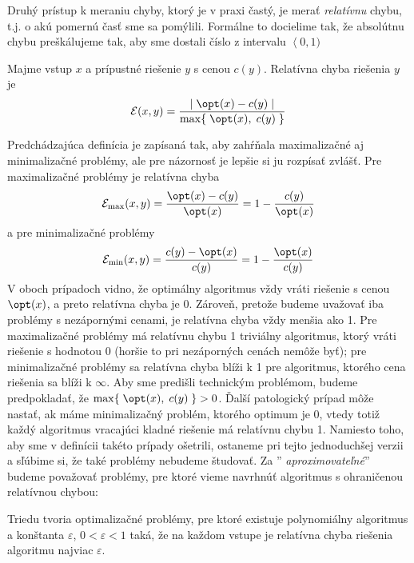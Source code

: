 Druhý prístup k meraniu chyby, ktorý je v praxi častý, je merať {\em relatívnu}
chybu, t.j. o akú pomernú časť sme sa pomýlili. Formálne to docielime tak, že
absolútnu chybu preškálujeme tak, aby sme dostali číslo z intervalu
$\left\langle0,1)\right.$


\begin{framed}
  \begin{dfn}
    Majme vstup $x$ a prípustné riešenie $y$  s cenou $c(y)$. Relatívna chyba riešenia $y$ je
    \[{\cal E}(x,y) = \frac{ |\; \opt(x)-c(y) \;|}{\max\{\; \opt(x), \; c(y)\; \}} \]
  \end{dfn}
\end{framed}

\noindent
Predchádzajúca definícia je zapísaná tak, aby zahŕňala maximalizačné aj
minimalizačné problémy, ale pre názornosť je lepšie si ju rozpísať zvlášť. Pre
maximalizačné problémy je relatívna chyba 
\[ {\cal E}_{\max}(x,y) = \frac{  \opt(x) - c(y) }{\opt(x)} = 1 - \frac{c(y)}{\opt(x)} \] 
a pre minimalizačné
problémy 
\[ {\cal E}_{\min}(x,y) = \frac{ c(y) - \opt(x)  }{c(y)} = 1 -\frac{\opt(x)}{c(y)} \] 
V oboch prípadoch vidno, že optimálny algoritmus vždy
vráti riešenie s cenou $\opt(x)$, a preto relatívna chyba je $0$. Zároveň,
pretože budeme uvažovať iba problémy s nezápornými cenami,  je relatívna chyba
vždy menšia ako 1. Pre maximalizačné problémy má relatívnu chybu 1 triviálny
algoritmus, ktorý vráti riešenie s hodnotou $0$ (horšie to pri nezáporných
cenách nemôže byť); pre minimalizačné problémy sa relatívna chyba blíži k 1 pre
algoritmus, ktorého cena riešenia sa blíži k $\infty$.  
Aby sme predišli technickým problémom, budeme predpokladať, že $\max\{\; \opt(x), \; c(y)\; \}>0$.
Ďalší patologický prípad môže nastať, ak máme minimalizačný problém, ktorého optimum je 0, vtedy totiž
každý algoritmus vracajúci kladné riešenie má relatívnu chybu 1. Namiesto toho, aby sme 
v definícii takéto prípady ošetrili, ostaneme pri tejto jednoduchšej verzii a sľúbime si, že také
problémy nebudeme študovať.
Za ''{\em
aproximovateľné}'' budeme považovať problémy, pre ktoré vieme navrhnúť
algoritmus s ohraničenou relatívnou chybou:

\begin{framed}
  \begin{dfn}
    \label{dfn:APX}
    Triedu \APX tvoria optimalizačné problémy, pre ktoré existuje polynomiálny algoritmus \algA a konštanta $\varepsilon$,
    $0<\varepsilon<1$ taká, že na každom vstupe je relatívna chyba riešenia algoritmu \algA najviac $\varepsilon$.
  \end{dfn}
\end{framed}

